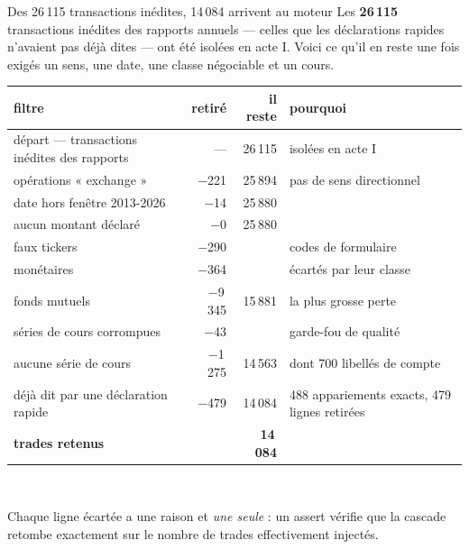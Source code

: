 \documentclass[11pt,aspectratio=169]{beamer}
\newcommand{\defl}[1]{{\scriptsize\color{black!55}#1}}
\begin{document}
\begin{frame}{Des 26\,115 transactions inédites, 14\,084 arrivent au moteur}
  \footnotesize
  Les \textbf{26\,115} transactions inédites des rapports annuels --- celles que les déclarations
  rapides n'avaient pas déjà dites --- ont été isolées en acte I. Voici ce qu'il en reste une fois
  exigés un sens, une date, une classe négociable et un cours.
  \medskip

  \centering\scriptsize
  \begin{tabular}{l r r l}
    \toprule
    filtre & retiré & il reste & pourquoi \\
    \midrule
    départ --- transactions inédites des rapports & --- & 26\,115 & \defl{isolées en acte I} \\
    opérations « exchange »        & $-$221   & 25\,894 & \defl{pas de sens directionnel} \\
    date hors fenêtre 2013-2026    & $-$14    & 25\,880 & \\
    aucun montant déclaré          & $-$0     & 25\,880 & \\
    faux tickers                   & $-$290   &        & \defl{codes de formulaire} \\
    monétaires                     & $-$364   &        & \defl{écartés par leur classe} \\
    fonds mutuels                  & $-$9\,345 & 15\,881 & \defl{la plus grosse perte} \\
    séries de cours corrompues     & $-$43    &        & \defl{garde-fou de qualité} \\
    aucune série de cours          & $-$1\,275 & 14\,563 & \defl{dont 700 libellés de compte} \\
    déjà dit par une déclaration rapide & $-$479 & 14\,084 & \defl{488 appariements exacts, 479 lignes retirées} \\
    \midrule
    \textbf{trades retenus} & & \textbf{14\,084} & \\
    \bottomrule
  \end{tabular}\\[2mm]

  \raggedright\footnotesize
  Chaque ligne écartée a une raison et \emph{une seule} : un assert vérifie que la cascade
  retombe exactement sur le nombre de trades effectivement injectés.
\end{frame}
\end{document}
